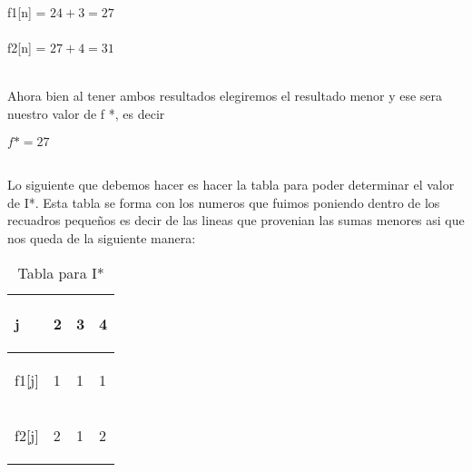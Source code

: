 \documentclass[12pt,twoside]{article}
\begin{document}
\begin{center}
   f1[n] =  $24 + 3 = 27$\\
   \\
   f2[n] =  $27 + 4 = 31$\\
\end{center}
\\
Ahora bien al tener ambos resultados elegiremos el resultado menor y ese sera nuestro valor de f *, es decir \\
\begin{center}
   $f* = 27$
\end{center}

\\
Lo siguiente que debemos hacer es hacer la tabla para poder determinar el valor de I*. Esta tabla se forma con los numeros que fuimos poniendo dentro de los recuadros pequeños es decir de las lineas que provenian las sumas menores asi que nos queda de la siguiente manera:
\begin{center}
    \begin{table}[!h]
        \centering

\begin{tabular}{|p{}|p{}|p{}|p{}|}
\hline
 \begin{center}
j
\end{center}
 & \begin{center}
2
\end{center}
 & \begin{center}
3
\end{center}
 & \begin{center}
4
\end{center}
 \\
\hline
 \begin{center}
f1[j]
\end{center}
 & \begin{center}
1
\end{center}
 & \begin{center}
1
\end{center}
 & \begin{center}
1
\end{center}
 \\
\hline
 \begin{center}
f2[j]
\end{center}
 & \begin{center}
2
\end{center}
 & \begin{center}
1
\end{center}
 & \begin{center}
2
\end{center}
 \\
 \hline
\end{tabular}
        \caption{Tabla para I*}
        \end{table}
\end{center}
\end{document}
